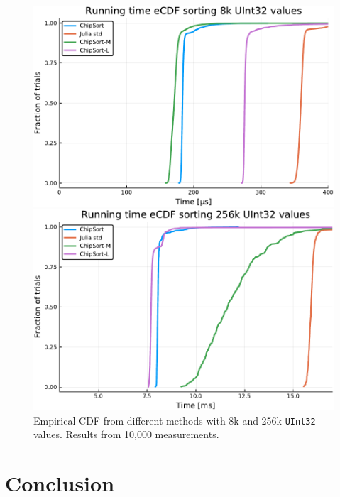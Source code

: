 \documentclass{juliacon}
\begin{document}
\begin{figure}[htb]
\centerline{\includegraphics[width=0.99\linewidth]{fig/chipsort-bench-8k.pdf}}
\centerline{\includegraphics[width=0.99\linewidth]{fig/chipsort-bench-256k.pdf}}
\caption{Empirical CDF from different methods with 8k and 256k {\tt UInt32} values. Results from 10,000 measurements.}
\label{fig:bench-cdf}
\end{figure}




\section{Conclusion}
\label{sec:conclusion}
%



\end{document}
